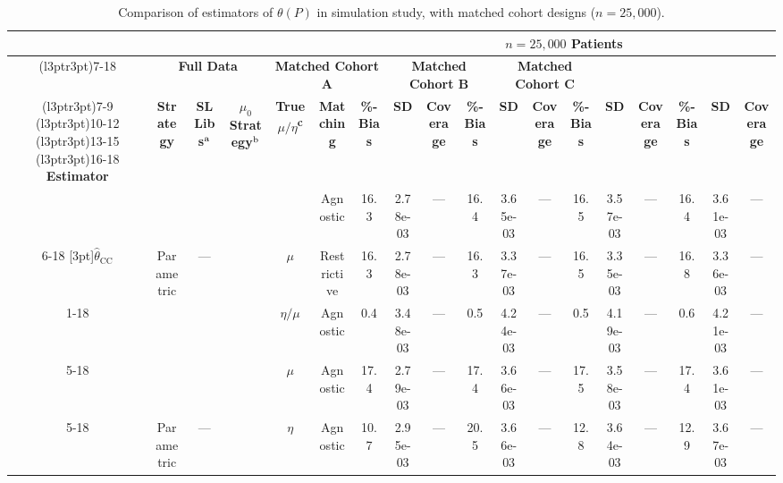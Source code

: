 \begin{table}\tiny

\caption{\label{tab:sim_results_matching}Comparison of estimators of $\theta(P)$ in simulation study, with matched cohort designs ($n = 25,000$).}
\centering
\begin{tabular}[t]{ccccccc@{}c@{}cc@{}c@{}cc@{}c@{}cc@{}c@{}c}
\toprule
\multicolumn{6}{c}{\textbf{ }} & \multicolumn{12}{c}{\textbf{$n = 25,000$ Patients}} \\
\cmidrule(l{3pt}r{3pt}){7-18}
\multicolumn{6}{c}{\textbf{ }} & \multicolumn{3}{c}{\textbf{Full Data}} & \multicolumn{3}{c}{\textbf{Matched Cohort A}} & \multicolumn{3}{c}{\textbf{Matched Cohort B}} & \multicolumn{3}{c}{\textbf{Matched Cohort C}} \\
\cmidrule(l{3pt}r{3pt}){7-9} \cmidrule(l{3pt}r{3pt}){10-12} \cmidrule(l{3pt}r{3pt}){13-15} \cmidrule(l{3pt}r{3pt}){16-18}
\textbf{Estimator} & \textbf{Strategy} & \textbf{SL Libs$\textsuperscript{a}$} & \textbf{$\mu_0$ Strategy$\textsuperscript{b}$} & \textbf{True $\mu/\eta$\textsuperscript{c}} & \textbf{Matching} & \textbf{\%-Bias} & \textbf{SD} & \textbf{Coverage} & \textbf{\%-Bias} & \textbf{SD} & \textbf{Coverage} & \textbf{\%-Bias} & \textbf{SD} & \textbf{Coverage} & \textbf{\%-Bias} & \textbf{SD} & \textbf{Coverage}\\
\midrule
 &  &  &  &  &  Agnostic & 16.3 & 2.78e-03 & --- & 16.4 & 3.65e-03 & --- & 16.5 & 3.57e-03 & --- & 16.4 & 3.61e-03 & ---\\
\cmidrule{6-18}
\multirow{-2}{*}[3pt]{\centering\arraybackslash $\widehat\theta_\text{CC}$} & \multirow{-2}{*}[3pt]{\centering\arraybackslash  Parametric} & \multirow{-2}{*}[3pt]{\centering\arraybackslash ---} & \multirow{-2}{*}[3pt]{\centering\arraybackslash  1} & \multirow{-2}{*}[3pt]{\centering\arraybackslash  $\mu$} &  Restrictive & 16.3 & 2.78e-03 & --- & 16.3 & 3.37e-03 & --- & 16.5 & 3.35e-03 & --- & 16.8 & 3.36e-03 & ---\\
\cmidrule{1-18}
 &  &  &  &  $\eta/\mu$ &  Agnostic & 0.4 & 3.48e-03 & --- & 0.5 & 4.24e-03 & --- & 0.5 & 4.19e-03 & --- & 0.6 & 4.21e-03 & ---\\
\cmidrule{5-18}
 &  &  &  &  $\mu$ &  Agnostic & 17.4 & 2.79e-03 & --- & 17.4 & 3.66e-03 & --- & 17.5 & 3.58e-03 & --- & 17.4 & 3.61e-03 & ---\\
\cmidrule{5-18}
 & \multirow{-3}{*}[5pt]{\centering\arraybackslash  Parametric} & \multirow{-3}{*}[5pt]{\centering\arraybackslash ---} & \multirow{-3}{*}[5pt]{\centering\arraybackslash  1} &  $\eta$ &  Agnostic & 10.7 & 2.95e-03 & --- & 20.5 & 3.66e-03 & --- & 12.8 & 3.64e-03 & --- & 12.9 & 3.67e-03 & ---\\

\end{tabular}
\end{table}
